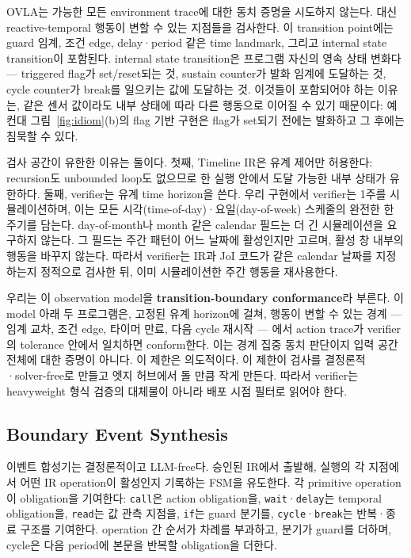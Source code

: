 \documentclass[sigconf,nonacm,anonymous,review]{acmart}
\begin{document}
OVLA는 가능한 모든 environment trace에 대한 동치 증명을 시도하지 않는다. 대신 reactive-temporal 행동이 변할 수 있는 지점들을 검사한다. 이 transition point에는 guard 임계, 조건 edge, delay·period 같은 time landmark, 그리고 internal state transition이 포함된다. internal state transition은 프로그램 자신의 영속 상태 변화다 — triggered flag가 set/reset되는 것, sustain counter가 발화 임계에 도달하는 것, cycle counter가 break를 일으키는 값에 도달하는 것. 이것들이 포함되어야 하는 이유는, 같은 센서 값이라도 내부 상태에 따라 다른 행동으로 이어질 수 있기 때문이다: 예컨대 그림~\ref{fig:idiom}(b)의 flag 기반 구현은 flag가 set되기 전에는 발화하고 그 후에는 침묵할 수 있다.

검사 공간이 유한한 이유는 둘이다. 첫째, Timeline IR은 유계 제어만 허용한다: recursion도 unbounded loop도 없으므로 한 실행 안에서 도달 가능한 내부 상태가 유한하다. 둘째, verifier는 유계 time horizon을 쓴다. 우리 구현에서 verifier는 1주를 시뮬레이션하며, 이는 모든 시각(time-of-day)·요일(day-of-week) 스케줄의 완전한 한 주기를 담는다. day-of-month나 month 같은 calendar 필드는 더 긴 시뮬레이션을 요구하지 않는다. 그 필드는 주간 패턴이 어느 날짜에 활성인지만 고르며, 활성 창 내부의 행동을 바꾸지 않는다. 따라서 verifier는 IR과 JoI 코드가 같은 calendar 날짜를 지정하는지 정적으로 검사한 뒤, 이미 시뮬레이션한 주간 행동을 재사용한다.

우리는 이 observation model을 \textbf{transition-boundary conformance}라 부른다. 이 model 아래 두 프로그램은, 고정된 유계 horizon에 걸쳐, 행동이 변할 수 있는 경계 — 임계 교차, 조건 edge, 타이머 만료, 다음 cycle 재시작 — 에서 action trace가 verifier의 tolerance 안에서 일치하면 conform한다. 이는 경계 집중 동치 판단이지 입력 공간 전체에 대한 증명이 아니다. 이 제한은 의도적이다. 이 제한이 검사를 결정론적·solver-free로 만들고 엣지 허브에서 돌 만큼 작게 만든다. 따라서 verifier는 heavyweight 형식 검증의 대체물이 아니라 배포 시점 필터로 읽어야 한다.

\subsection{Boundary Event Synthesis}

이벤트 합성기는 결정론적이고 LLM-free다. 승인된 IR에서 출발해, 실행의 각 지점에서 어떤 IR operation이 활성인지 기록하는 FSM을 유도한다. 각 primitive operation이 obligation을 기여한다: \texttt{call}은 action obligation을, \texttt{wait}·\texttt{delay}는 temporal obligation을, \texttt{read}는 값 관측 지점을, \texttt{if}는 guard 분기를, \texttt{cycle}·\texttt{break}는 반복·종료 구조를 기여한다. operation 간 순서가 차례를 부과하고, 분기가 guard를 더하며, cycle은 다음 period에 본문을 반복할 obligation을 더한다.
\end{document}
